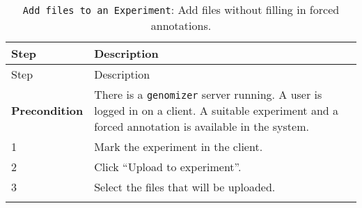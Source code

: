 \begin{longtable}[c]{@{}ll@{}}
\caption{\texttt{Add\ files\ to\ an\ Experiment}: Add files without
filling in forced annotations.}\tabularnewline
\toprule
\begin{minipage}[b]{0.31\columnwidth}\raggedright\strut
Step
\strut\end{minipage} &
\begin{minipage}[b]{0.63\columnwidth}\raggedright\strut
Description
\strut\end{minipage}\tabularnewline
\midrule
\endfirsthead
\toprule
\begin{minipage}[b]{0.31\columnwidth}\raggedright\strut
Step
\strut\end{minipage} &
\begin{minipage}[b]{0.63\columnwidth}\raggedright\strut
Description
\strut\end{minipage}\tabularnewline
\midrule
\endhead
\begin{minipage}[t]{0.31\columnwidth}\raggedright\strut
\textbf{Precondition}
\strut\end{minipage} &
\begin{minipage}[t]{0.63\columnwidth}\raggedright\strut
There is a \texttt{genomizer} server running. A user is logged in on a
client. A suitable experiment and a forced annotation is available in
the system.
\strut\end{minipage}\tabularnewline
\begin{minipage}[t]{0.31\columnwidth}\raggedright\strut
1
\strut\end{minipage} &
\begin{minipage}[t]{0.63\columnwidth}\raggedright\strut
Mark the experiment in the client.
\strut\end{minipage}\tabularnewline
\begin{minipage}[t]{0.31\columnwidth}\raggedright\strut
2
\strut\end{minipage} &
\begin{minipage}[t]{0.63\columnwidth}\raggedright\strut
Click ``Upload to experiment''.
\strut\end{minipage}\tabularnewline
\begin{minipage}[t]{0.31\columnwidth}\raggedright\strut
3
\strut\end{minipage} &
\begin{minipage}[t]{0.63\columnwidth}\raggedright\strut
Select the files that will be uploaded.
\strut\end{minipage}\tabularnewline
\begin{minipage}[t]{0.31\columnwidth}\raggedright\strut

\end{minipage}
\end{longtable}
